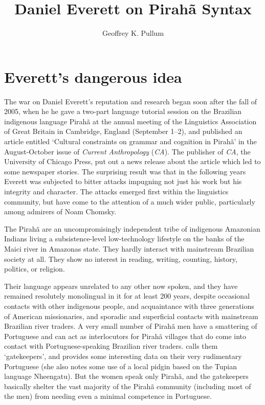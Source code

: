 \documentclass[output=paper,colorlinks,citecolor=brown
]{langscibook}
\author{Geoffrey K. Pullum\orcid{0000-0002-7748-8847}\affiliation{University of Edinburgh}}
\title{Daniel Everett on Pirah\~a Syntax}
\begin{document}
\maketitle


\section{Everett's dangerous idea}\label{intro}

The war on Daniel Everett's reputation and research began soon after
the fall of 2005, when he he gave a two-part language tutorial session
on the Brazilian indigenous language Pirah{\~a} at the annual meeting
of the Linguistics Association of Great Britain in Cambridge, England
(September 1--2), and published an article entitled `Cultural constraints
on grammar and cognition in Pirah{\~a}' in the August-October issue of
\textit{Current Anthropology} (\textit{CA}). The publisher of \textit{CA},
the University of Chicago Press, put out a news release about the article
which led to some newspaper stories. The surprising result was that in
the following years Everett was subjected to bitter attacks impugning
not just his work but his integrity and character. The attacks emerged
first within the linguistics community, but have come to the attention
of a much wider public, particularly among admirers of Noam Chomsky.

The Pirah{\~a} are an uncompromisingly independent tribe of indigenous
Amazonian Indians living a subsistence-level low-technology lifestyle
on the banks of the Maici river in Amazonas state. They hardly interact
with mainstream Brazilian society at all. They show no interest in
reading, writing, counting, history, politics, or religion.

Their language appears unrelated to any other now spoken, and they
have remained resolutely monolingual in it for at least 200 years,
despite occasional contacts with other indigenous people, and
acquaintance with three generations of American missionaries, and
sporadic and superficial contacts with mainstream Brazilian river
traders. A very small number of Pirah{\~a} men have a smattering of
Portuguese and can act as interlocutors for Pirah{\~a} villages that
do come into contact with Portuguese-speaking Brazilian river traders.
\citet{Sakel12} calls them `gatekeepers', and provides some interesting
data on their very rudimentary Portuguese (she also notes some use
of a local pidgin based on the Tupian language Nheengatu). But the
women speak only Pirah{\~a}, and the gatekeepers basically shelter
the vast majority of the Pirah{\~a} community (including most of the
men) from needing even a minimal competence in Portuguese.
\end{document}
